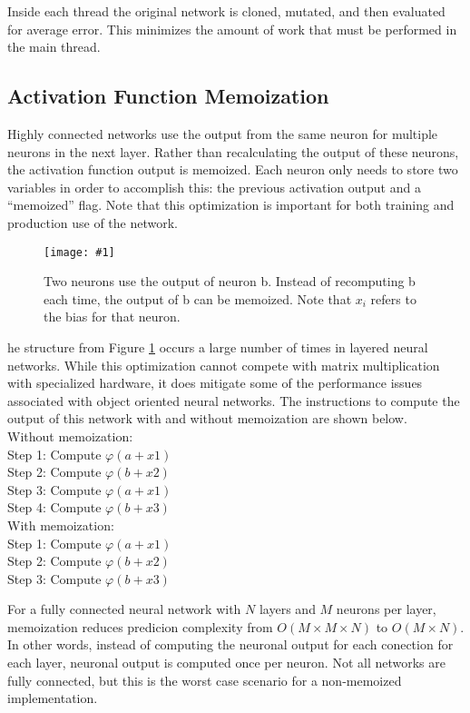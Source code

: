\documentclass[twocolumn]{article}
\newcommand\fig[5]{
	\begin{figure}[H]
		\begin{center}\texttt{[image: \#1]}\end{center}
		\caption{#4}\label{fig:#2}
	\end{figure}
}
\newcommand\figRef[1]{Figure \ref{fig:#1}\xspace}
\begin{document}
Inside each thread the original network is cloned, mutated, and then evaluated for average error. This minimizes the amount of work that must be performed in the main thread.

\subsection{Activation Function Memoization}

Highly connected networks use the output from the same neuron for multiple neurons in the next layer. Rather than recalculating the output of these neurons, the activation function output is memoized. Each neuron only needs to store two variables in order to accomplish this: the previous activation output and a ``memoized'' flag. Note that this optimization is important for both training and production use of the network.

\fig{images/memoization.png}{memoization}{0.4}{
Two neurons use the output of neuron b. Instead of recomputing b each time, the output of b can be memoized. Note that $x_i$ refers to the bias for that neuron.
}

The structure from \figRef{memoization} occurs a large number of times in layered neural networks. While this optimization cannot compete with matrix multiplication with specialized hardware, it does mitigate some of the performance issues associated with object oriented neural networks. The instructions to compute the output of this network with and without memoization are shown below. \\

\noindent Without memoization: \\
\indent Step 1: Compute $\varphi(a+x1)$ \\
\indent Step 2: Compute $\varphi(b+x2)$ \\
\indent Step 3: Compute $\varphi(a+x1)$ \\
\indent Step 4: Compute $\varphi(b+x3)$ \\

\noindent With memoization: \\
\indent Step 1: Compute $\varphi(a+x1)$ \\
\indent Step 2: Compute $\varphi(b+x2)$ \\
\indent Step 3: Compute $\varphi(b+x3)$

For a fully connected neural network with $N$ layers and $M$ neurons per layer, memoization reduces predicion complexity from $O(M \times M \times N)$ to $O(M \times N)$. In other words, instead of computing the neuronal output for each conection for each layer, neuronal output is computed once per neuron. Not all networks are fully connected, but this is the worst case scenario for a non-memoized implementation. 
\end{document}

